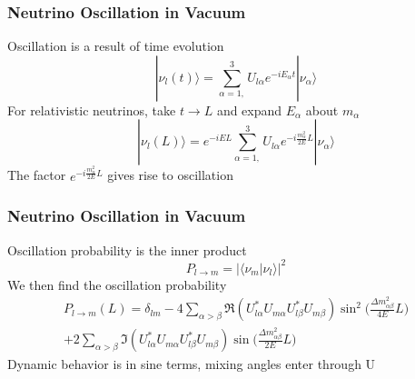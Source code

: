\documentclass[10pt,professionalfonts,xcolor=table]{beamer}
\begin{document}
\frame
{
  \frametitle{Neutrino Oscillation in Vacuum}
  \begin{itemize}
	\bang Oscillation is a result of time evolution
	\begin{equation*}
		|\nu_l(t) \rangle = \sum_{\alpha = 1,}^3 U_{l\alpha}e^{-iE_\alpha t}|\nu_\alpha \rangle
	\end{equation*}
	\bang For relativistic neutrinos, take $t \rightarrow L$ and expand $E_\alpha$ about $m_\alpha$
	\begin{equation*}
		|\nu_l(L) \rangle = e^{-iEL} \sum_{\alpha = 1,}^3 U_{l\alpha}e^{-i\frac{m_\alpha^2}{2E} L}|\nu_\alpha \rangle
	\end{equation*}
  \gap
	\bang The factor $e^{-i\frac{m_\alpha^2}{2E} L}$ gives rise to oscillation


  \end{itemize}
}

\frame
{
  \frametitle{Neutrino Oscillation in Vacuum}
  \begin{itemize}
\bang Oscillation probability is the inner product
  \begin{equation*}
P_{l\rightarrow m} = 	 |\langle \nu_m|\nu_l \rangle|^2
	\end{equation*}
	\bang We then find the oscillation probability
	\begin{equation*}\begin{split}
P_{l\rightarrow m}(L) =  \delta_{lm} - 4  \sum_{\alpha > \beta}  \Re(U^*_{l\alpha}U_{m\alpha}U^*_{l\beta}U_{m\beta}) \sin^2 \bigg(\frac{\Delta m_{\alpha\beta}^2}{4E} L\bigg) \\
 + 2  \sum_{\alpha>\beta}  \Im(U^*_{l\alpha}U_{m\alpha}U^*_{l\beta}U_{m\beta}) \sin\bigg(\frac{\Delta m_{\alpha\beta}^2}{2E}L\bigg)
\end{split}\end{equation*}
	\bang Dynamic behavior is in sine terms, mixing angles enter through U


  \end{itemize}
}
\end{document}

